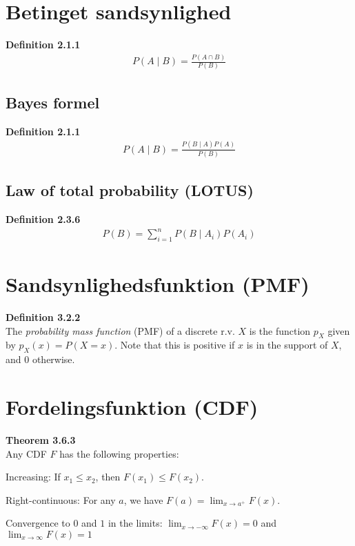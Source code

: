 \documentclass{article}
\begin{document}
\section*{Betinget sandsynlighed}
\textbf{Definition 2.1.1}\\
\begin{align*}
  P(A \mid B) = \frac{P(A \cap B)}{P(B)}
\end{align*}

\subsection*{Bayes formel}
\textbf{Definition 2.1.1}\\
\begin{align*}
  P(A \mid B) = \frac{P(B \mid A) P(A)}{P(B)}
\end{align*}

\subsection*{Law of total probability (LOTUS)}
\textbf{Definition 2.3.6}\\
\begin{align*}
  P(B) = \sum_{i=1}^{n}{P(B \mid A_i) P(A_i)}
\end{align*}

\section*{Sandsynlighedsfunktion (PMF)}
\textbf{Definition 3.2.2}\\
The \textit{probability mass function} (PMF) of a discrete r.v. $X$ is the function $p_{X}$ given by $p_{X}(x) = P(X = x)$. Note that this is positive if $x$ is in the support of $X$, and $0$ otherwise.

\section*{Fordelingsfunktion (CDF)}
\textbf{Theorem 3.6.3}\\
Any CDF $F$ has the following properties:
\begin{itemize*}
  \item Increasing: If $x_1 \leq x_2$, then $F(x_1) \leq F(x_2)$.
  \item Right-continuous: For any $a$, we have $F(a) = \lim_{x \to a^+}{F(x)}$.
  \item Convergence to $0$ and $1$ in the limits: $\lim_{x \to -\infty}{F(x)} = 0$ and $\lim_{x \to \infty}{F(x)} = 1$
\end{itemize*}
\end{document}
